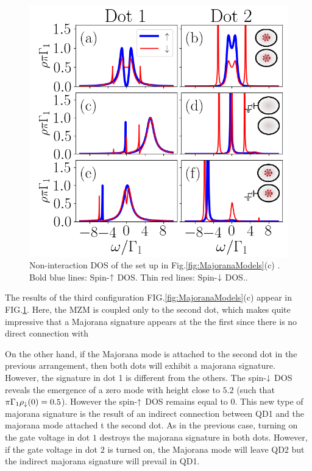 \documentclass[showpacs,aps,prb,reprint,superscriptaddress]{revtex4-1}
\begin{document}
\begin{figure}[bt]
\begin{center}
\includegraphics[scale=0.48]{Graficos/t2>0.png}
\caption{  \label{fig:t2>0} Non-interaction DOS of the set up in Fig.\ref{fig:MajoranaModels}(c) . Bold blue lines: Spin-$\uparrow$ DOS. Thin red lines: Spin-$\downarrow$ DOS.. 
}
%
\end{center}
\end{figure}
    The results of the third configuration FIG.\ref{fig:MajoranaModels}(c) appear in FIG.\ref{fig:t2>0}. Here, the MZM is coupled only to the second dot, which makes quite impressive that a Majorana signature appears at the the first since there is no direct connection  with 



    On the other hand, if the Majorana mode is attached to the second dot in the previous arrangement, then both dots will exhibit a majorana signature. However, the signature in dot 1 is different from the others. The spin-$\downarrow$ DOS reveals the emergence of a zero mode with height close to $5.2$ (such that $\pi  \Gamma_1 \rho_\downarrow(0) = 0.5$). However the spin-$\uparrow$ DOS remains equal to $0$. This new type of majorana signature is the result of an indirect connection between QD1 and the majorana mode attached t the second dot. As in the previous case, turning on the gate voltage in dot $1$ destroys the majorana signature in both dots. However, if the gate voltage in dot $2$ is turned on, the Majorana mode will leave QD2 but the indirect majorana signature will prevail in QD1. 
    
\end{document}
